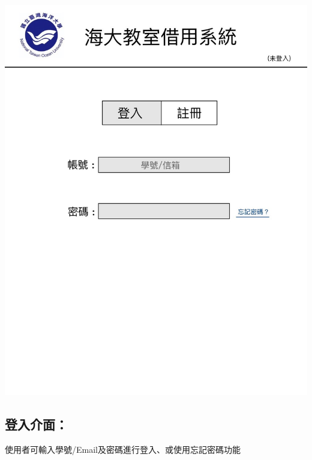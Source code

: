 \documentclass{article}
\begin{document}
\begin{minipage}{0.6\linewidth}
	\includegraphics[height=0.4\textheight]{Log_In_GUI.jpg}
\end{minipage}
\begin{minipage}{0.4\linewidth}
	\subsection*{登入介面：}使用者可輸入學號/Email及密碼進行登入、或使用忘記密碼功能
\end{minipage}
\end{document}
